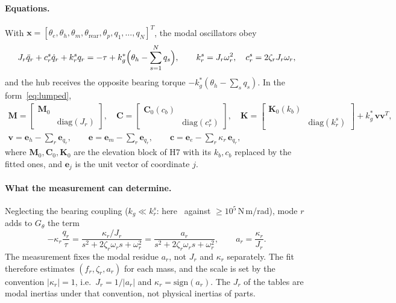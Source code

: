 \documentclass[10pt,a4paper]{article}
\numberwithin{equation}{section}
\begin{document}
\paragraph{Equations.} With $\mathbf x=[\theta_e,\theta_h,\theta_m,\theta_\mathrm{rear},\theta_p,q_1,\dots,q_N]^T$, the modal oscillators obey
\begin{equation}
J_r\ddot q_r+c_r^s\dot q_r+k_r^s q_r=-\tau+k_g^*\Bigl(\theta_h-\sum_{s=1}^{N}q_s\Bigr),\qquad k_r^s=J_r\omega_r^2,\quad c_r^s=2\zeta_rJ_r\omega_r ,\label{eq:modal}
\end{equation}
and the hub receives the opposite bearing torque $-k_g^*(\theta_h-\sum_s q_s)$. In the form~\eqref{eq:lumped},
\begin{gather}
\mathbf M=\begin{bmatrix}\mathbf M_0&\\&\mathrm{diag}(J_r)\end{bmatrix},\quad
\mathbf C=\begin{bmatrix}\mathbf C_0(c_b)&\\&\mathrm{diag}(c_r^s)\end{bmatrix},\quad
\mathbf K=\begin{bmatrix}\mathbf K_0(k_b)&\\&\mathrm{diag}(k_r^s)\end{bmatrix}+k_g^*\,\mathbf v\mathbf v^T,\\
\mathbf v=\mathbf e_h-\sum_r\mathbf e_{q_r},\qquad \mathbf e=\mathbf e_m-\sum_r\mathbf e_{q_r},\qquad \mathbf c=\mathbf e_e-\sum_r\kappa_r\,\mathbf e_{q_r},
\end{gather}
where $\mathbf M_0,\mathbf C_0,\mathbf K_0$ are the elevation block of H7 with its $k_b,c_b$ replaced by the fitted ones, and $\mathbf e_j$ is the unit vector of coordinate $j$.

\paragraph{What the measurement can determine.} Neglecting the bearing coupling ($k_g\ll k_r^s$: here \kg\ against $\geq10^5$\,N\,m/rad), mode $r$ adds to $G_\theta$ the term
\begin{equation}
-\kappa_r\frac{q_r}{\tau}=\frac{\kappa_r/J_r}{s^2+2\zeta_r\omega_rs+\omega_r^2}=\frac{a_r}{s^2+2\zeta_r\omega_rs+\omega_r^2},\qquad a_r=\frac{\kappa_r}{J_r} .\label{eq:residue}
\end{equation}
The measurement fixes the modal residue $a_r$, not $J_r$ and $\kappa_r$ separately. The fit therefore estimates $(f_r,\zeta_r,a_r)$ for each mass, and the scale is set by the convention $|\kappa_r|=1$, i.e.\ $J_r=1/|a_r|$ and $\kappa_r=\mathrm{sign}(a_r)$. The $J_r$ of the tables are modal inertias under that convention, not physical inertias of parts.
\end{document}
